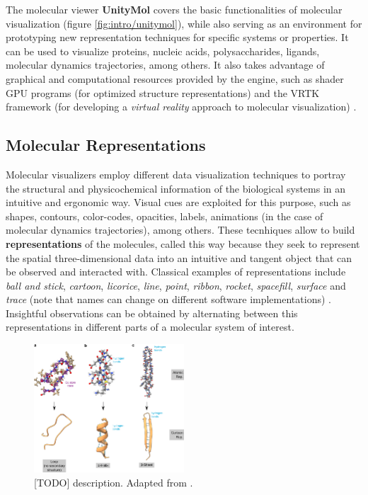    The molecular viewer \textbf{UnityMol} covers the basic functionalities of molecular visualization (figure \ref{fig:intro/unitymol}), while also serving as an environment for prototyping new representation techniques for specific systems or properties. It can be used to visualize proteins, nucleic acids, polysaccharides, ligands, molecular dynamics trajectories, among others. It also takes advantage of graphical and computational resources provided by the engine, such as shader GPU programs (for optimized structure representations) and the VRTK framework (for developing a \textit{virtual reality} approach to molecular visualization) \cite{unitymol_2015, unitymol_web}.

  \subsection{Molecular Representations}
    Molecular visualizers employ different data visualization techniques to portray the structural and physicochemical information of the biological systems in an intuitive and ergonomic way. Visual cues are exploited for this purpose, such as shapes, contours, color-codes, opacities, labels, animations (in the case of molecular dynamics trajectories), among others. These tecnhiques allow to build \textbf{representations} of the molecules, called this way because they seek to represent the spatial three-dimensional data into an intuitive and tangent object that can be observed and interacted with. Classical examples of representations include \textit{ball and stick}, \textit{cartoon}, \textit{licorice}, \textit{line}, \textit{point}, \textit{ribbon}, \textit{rocket}, \textit{spacefill}, \textit{surface} and \textit{trace} (note that names can change on different software implementations) \cite{representations_web}. Insightful observations can be obtained by alternating between this representations in different parts of a molecular system of interest.

    \begin{figure}[H]
      \centering
      \includegraphics[width=0.5\textwidth]{figures/intro/rep_cartoon.png}
      \caption{\label{fig:intro/rep_cartoon} [TODO] description. Adapted from \cite{representations_2021}.}
    \end{figure}

